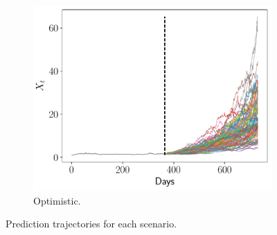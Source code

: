 \documentclass[11pt]{article}
\theoremstyle{definition}
\theoremstyle{remark}
\theoremstyle{remark}
\begin{document}
\begin{figure}[H]
\begin{subfigure}[b]{0.45\textwidth}
      \includegraphics[scale=0.45]{pronostico-optimista.pdf}
      \caption{Optimistic.}
  \end{subfigure}
  \caption{Prediction trajectories for each scenario.}
\end{figure}
\end{document}

